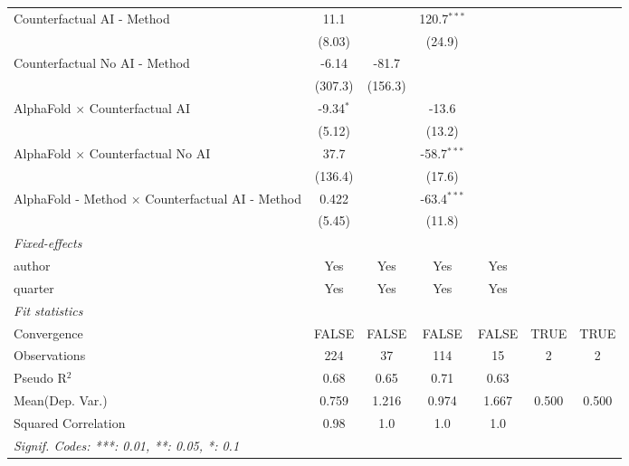 \begin{tabular}{lcccccc}
   Counterfactual AI - Method                              & 11.1        &         & 120.7$^{***}$ &         &      &   \\   
                                                           & (8.03)      &         & (24.9)        &         &      &   \\   
   Counterfactual No AI - Method                           & -6.14       & -81.7   &               &         &      &   \\   
                                                           & (307.3)     & (156.3) &               &         &      &   \\   
   AlphaFold $\times$ Counterfactual AI                    & -9.34$^{*}$ &         & -13.6         &         &      &   \\   
                                                           & (5.12)      &         & (13.2)        &         &      &   \\   
   AlphaFold $\times$ Counterfactual No AI                 & 37.7        &         & -58.7$^{***}$ &         &      &   \\   
                                                           & (136.4)     &         & (17.6)        &         &      &   \\   
   AlphaFold - Method $\times$ Counterfactual AI - Method  & 0.422       &         & -63.4$^{***}$ &         &      &   \\   
                                                           & (5.45)      &         & (11.8)        &         &      &   \\   
   \midrule
   \emph{Fixed-effects}\\
   author                                                  & Yes         & Yes     & Yes           & Yes     &      & \\  
   quarter                                                 & Yes         & Yes     & Yes           & Yes     &      & \\  
   \midrule
   \emph{Fit statistics}\\
   Convergence                                             &FALSE        & FALSE   & FALSE         & FALSE   & TRUE & TRUE\\  
   Observations                                            & 224         & 37      & 114           & 15      & 2    & 2\\  
   Pseudo R$^2$                                            & 0.68        & 0.65    & 0.71          & 0.63    &      & \\  
Mean(Dep. Var.) & 0.759 & 1.216 & 0.974 & 1.667 & 0.500 & 0.500 \\
   Squared Correlation                                     & 0.98        & 1.0     & 1.0           & 1.0     &      & \\  
   \midrule \midrule
   \multicolumn{7}{l}{\emph{Signif. Codes: ***: 0.01, **: 0.05, *: 0.1}}\\
\end{tabular}
\par\endgroup
